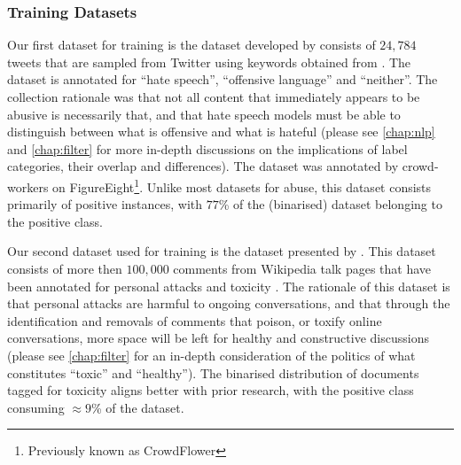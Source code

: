 
\subsubsection{Training Datasets}
Our first dataset for training is the dataset developed by \citet{Davidson:2017} consists of $24,784$ tweets that are sampled from Twitter using keywords obtained from \citet{Hatebase}. The dataset is annotated for ``hate speech'', ``offensive language'' and ``neither''. The collection rationale was that not all content that immediately appears to be abusive is necessarily that, and that hate speech models must be able to distinguish between what is offensive and what is hateful \cite{Davidson:2017} (please see \autoref{chap:nlp} and \autoref{chap:filter} for more in-depth discussions on the implications of label categories, their overlap and differences). The dataset was annotated by crowd-workers on FigureEight\footnote{Previously known as CrowdFlower}. Unlike most datasets for abuse, this dataset consists primarily of positive instances, with $77$\% of the (binarised) dataset belonging to the positive class.

Our second dataset used for training is the dataset presented by \citet{Wulczyn:2017}. This dataset consists of more then $100,000$ comments from Wikipedia talk pages that have been annotated for personal attacks and toxicity \cite{Wulczyn:2017}. The rationale of this dataset is that personal attacks are harmful to ongoing conversations, and that through the identification and removals of comments that poison, or toxify online conversations, more space will be left for healthy and constructive discussions (please see \autoref{chap:filter} for an in-depth consideration of the politics of what constitutes ``toxic'' and ``healthy''). The binarised distribution of documents tagged for toxicity aligns better with prior research, with the positive class consuming $\approx 9$\% of the dataset.

